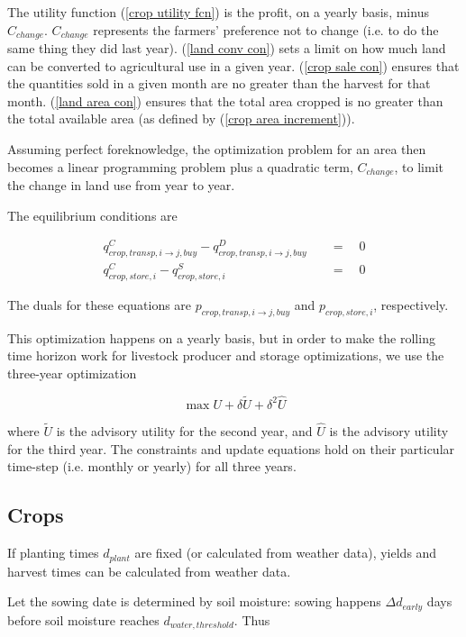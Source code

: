 \documentclass[letter,12pt]{article}
\begin{document}
The utility function (\ref{crop utility fcn}) is the profit, on a yearly basis, minus $C_{change}$.  $C_{change}$ represents the farmers' preference not to change (i.e. to do the same thing they did last year).  (\ref{land conv con}) sets a limit on how much land can be converted to agricultural use in a given year.  (\ref{crop sale con}) ensures that the quantities sold in a given month are no greater than the harvest for that month.  (\ref{land area con}) ensures that the total area cropped is no greater than the total available area (as defined by (\ref{crop area increment})).  

Assuming perfect foreknowledge, the optimization problem for an area then becomes a linear programming problem plus a quadratic term, $C_{change}$, to limit the change in land use from year to year.

The equilibrium conditions are

\begin{align}
q_{crop,transp,i\rightarrow j,buy}^C - q_{crop,transp,i\rightarrow j,buy}^D \quad &= \quad  0\\
q_{crop,store,i}^C - q_{crop,store,i}^S \quad &= \quad  0
\end{align}

The duals for these equations are $p_{crop,transp,i\rightarrow j,buy}$ and $p_{crop,store,i}$, respectively.

This optimization happens on a yearly basis, but in order to make the rolling time horizon work for livestock producer and storage optimizations, we use the three-year optimization

\begin{equation}
\max U + \delta \tilde{U} + \delta^2 \hat{U}
\end{equation}

\noindent where $\tilde{U}$ is the advisory utility for the second year, and $\hat{U}$ is the advisory utility for the third year.  The constraints and update equations hold on their particular time-step (i.e. monthly or yearly) for all three years.


\subsection{Crops}

If planting times $d_{plant}$ are fixed (or calculated from weather data), yields and harvest times can be calculated from weather data.

Let the sowing date is determined by soil moisture: sowing happens $\Delta d_{early}$ days before soil moisture reaches $d_{water,threshold}$.  Thus
\end{document}
